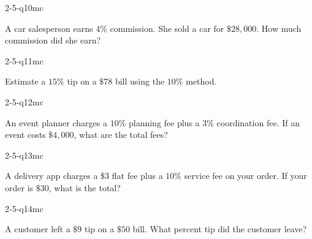 \begin{practiceQuestion}{2-5-q10}{mc}
\begin{questionText}
A car salesperson earns $4\%$ commission. She sold a car for $\$28{,}000$. How much commission did she earn?
\end{questionText}
\end{practiceQuestion}

\begin{practiceQuestion}{2-5-q11}{mc}
\begin{questionText}
Estimate a $15\%$ tip on a $\$78$ bill using the $10\%$ method.
\end{questionText}
\end{practiceQuestion}

\begin{practiceQuestion}{2-5-q12}{mc}
\begin{questionText}
An event planner charges a $10\%$ planning fee plus a $3\%$ coordination fee. If an event costs $\$4{,}000$, what are the total fees?
\end{questionText}
\end{practiceQuestion}

\begin{practiceQuestion}{2-5-q13}{mc}
\begin{questionText}
A delivery app charges a $\$3$ flat fee plus a $10\%$ service fee on your order. If your order is $\$30$, what is the total?
\end{questionText}
\end{practiceQuestion}

\begin{practiceQuestion}{2-5-q14}{mc}
\begin{questionText}
A customer left a $\$9$ tip on a $\$50$ bill. What percent tip did the customer leave?
\end{questionText}
\end{practiceQuestion}

